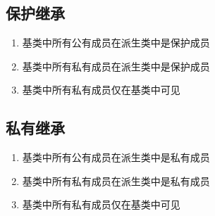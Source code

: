 \subsection{保护继承}

\begin{enumerate}
    \item 基类中所有公有成员在派生类中是保护成员
    \item 基类中所有私有成员在派生类中是保护成员
    \item 基类中所有私有成员仅在基类中可见
\end{enumerate}


\subsection{私有继承}

\begin{enumerate}
    \item 基类中所有公有成员在派生类中是私有成员
    \item 基类中所有私有成员在派生类中是私有成员
    \item 基类中所有私有成员仅在基类中可见
\end{enumerate}

\newpage